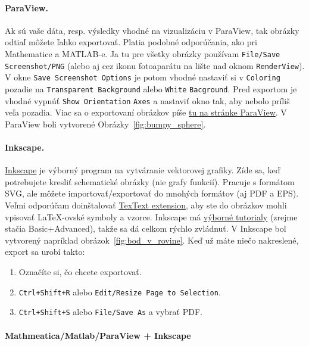 \paragraph{ParaView.}

Ak sú vaše dáta, resp. výsledky vhodné na vizualizáciu v ParaView, tak obrázky odtiaľ môžete ľahko exportovať. Platia podobné odporúčania, ako pri Mathematice a MATLAB-e. Ja tu pre všetky obrázky používam \verb|File/Save Screenshot/PNG| (alebo aj cez ikonu fotoaparátu na lište nad oknom \verb|RenderView|). V okne \verb|Save Screenshot Options| je potom vhodné nastaviť si v \verb|Coloring| pozadie na \verb|Transparent Background| alebo \verb|White| \verb|Bacground|. Pred exportom je vhodné vypnúť \verb|Show Orientation| \verb|Axes| a nastaviť okno tak, aby nebolo príliš veľa pozadia. 
Viac sa o exportovaní obrázkov píše \href{https://docs.paraview.org/en/v5.8/UsersGuide/savingResults.html}{tu na stránke ParaView}. V ParaView boli vytvorené Obrázky~\ref{fig:bumpy_sphere}.


\paragraph{Inkscape.}

\href{https://inkscape.org/}{Inkscape} je výborný program na vytváranie vektorovej grafiky. Zíde sa, keď potrebujete kresliť schematické obrázky (nie grafy funkcií). Pracuje s formátom SVG, ale môžete importovať/exportovať do mnohých formátov (aj PDF a EPS). Veľmi odporúčam doinštalovať \href{https://inkscape.org/~jcwinkler/%E2%98%85textext}{TexText extension}, aby ste do obrázkov mohli vpisovať LaTeX-ovské symboly a vzorce. Inkscape má \href{https://inkscape.org/learn/}{výborné tutorialy} (zrejme stačia Basic+Advanced), takže sa dá celkom rýchlo zvládnuť. V Inkscape bol vytvorený napríklad obrázok~\ref{fig:bod_v_rovine}. Keď už máte niečo nakreslené, export sa urobí takto:
\begin{enumerate}
	\item Označíte si, čo chcete exportovať.
	\item \verb|Ctrl+Shift+R| alebo \verb|Edit/Resize Page to Selection|.
	\item \verb|Ctrl+Shift+S| alebo \verb|File/Save As| a vybrať PDF. 
\end{enumerate}

\paragraph{Mathmeatica/Matlab/ParaView + Inkscape}

